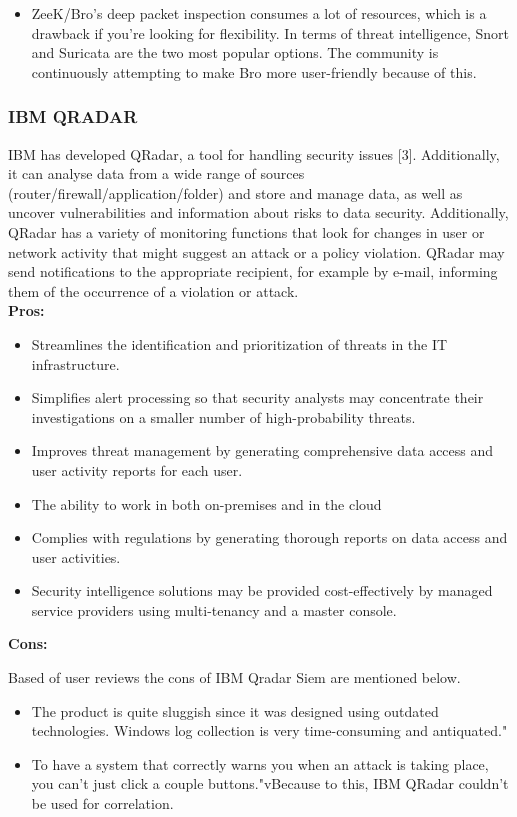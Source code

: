 \begin{itemize}
    \item ZeeK/Bro's deep packet inspection consumes a lot of resources, which is a drawback if you're looking for flexibility. In terms of threat intelligence, Snort and Suricata are the two most popular options. The community is continuously attempting to make Bro more user-friendly because of this.
    \\
\end{itemize}

\subsubsection{IBM QRADAR}

IBM has developed QRadar, a tool for handling security issues [3]. Additionally, it can analyse data from a wide range of sources (router/firewall/application/folder) and store and manage data, as well as uncover vulnerabilities and information about risks to data security. Additionally, QRadar has a variety of monitoring functions that look for changes in user or network activity that might suggest an attack or a policy violation. QRadar may send notifications to the appropriate recipient, for example by e-mail, informing them of the occurrence of a violation or attack.
\\

{\bfseries{Pros:}}

\begin{itemize}
    \item Streamlines the identification and prioritization of threats in the IT infrastructure.
    \item Simplifies alert processing so that security analysts may concentrate their investigations on a smaller number of high-probability threats.
    \item Improves threat management by generating comprehensive data access and user activity reports for each user.
    \item The ability to work in both on-premises and in the cloud
    \item Complies with regulations by generating thorough reports on data access and user activities.
    \item Security intelligence solutions may be provided cost-effectively by managed service providers using multi-tenancy and a master console.
    \\
\end{itemize}

{\bfseries{Cons:}}

Based of user reviews the cons of IBM Qradar Siem are mentioned below.\\
\begin{itemize}
    \item The product is quite sluggish since it was designed using outdated technologies. Windows log collection is very time-consuming and antiquated."
    \item To have a system that correctly warns you when an attack is taking place, you can't just click a couple buttons."vBecause to this, IBM QRadar couldn't be used for correlation.
    
\end{itemize}
